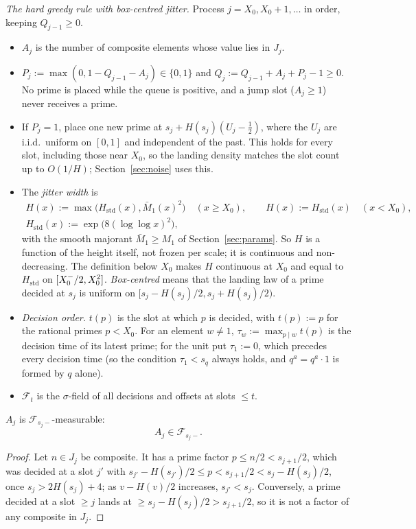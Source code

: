 \emph{The hard greedy rule with box-centred jitter.} Process $j=X_0,X_0+1,\dots$ in order, keeping $Q_{j-1}\ge0$.
\begin{itemize}
\item $A_j$ is the number of composite elements whose value lies in $J_j$.
\item $P_j:=\max(0,1-Q_{j-1}-A_j)\in\{0,1\}$ and $Q_j:=Q_{j-1}+A_j+P_j-1\ge0$. No prime is placed while the queue is positive, and a
jump slot ($A_j\ge1$) never receives a prime.
\item If $P_j=1$, place one new prime at $s_j+H(s_j)(U_j-\tfrac12)$, where the $U_j$ are i.i.d.\ uniform on $[0,1]$ and independent
of the past. This holds for every slot, including those near $X_0$, so the landing density matches the slot count up to
$O(1/H)$; Section~\ref{sec:noise} uses this.
\item The \emph{jitter width} is
\begin{equation}\label{eq:jitter}
\begin{gathered}
  H(x):=\max\bigl(H_{\mathrm{std}}(x),\bar M_1(x)^2\bigr)\quad(x\ge X_0),\qquad H(x):=H_{\mathrm{std}}(x)\quad(x<X_0),\\
  H_{\mathrm{std}}(x):=\exp\bigl(8(\log\log x)^2\bigr),
\end{gathered}
\end{equation}
with the smooth majorant $\bar M_1\ge M_1$ of Section~\ref{sec:params}. So $H$ is a function of the height itself, not frozen per
scale; it is continuous and non-decreasing. The definition below $X_0$ makes $H$ continuous at $X_0$ and equal to
$H_{\mathrm{std}}$ on $[X_0^{-}/2,X_0^2]$. \emph{Box-centred} means that the landing law of a prime decided at $s_j$ is uniform on
$[s_j-H(s_j)/2,s_j+H(s_j)/2)$.
\item \emph{Decision order.} $t(p)$ is the slot at which $p$ is decided, with $t(p):=p$ for the rational primes $p<X_0$. For an
element $w\ne1$, $\tau_w:=\max_{p\mid w}t(p)$ is the decision time of its latest prime; for the unit put $\tau_1:=0$, which
precedes every decision time (so the condition $\tau_1<s_q$ always holds, and $q^a=q^a\cdot1$ is formed by $q$ alone).
\item $\mathcal F_t$ is the $\sigma$-field of all decisions and offsets at slots $\le t$.
\end{itemize}

\begin{lemma}[Causality]\label{lem:C2}
$A_j$ is $\mathcal F_{s_j-}$-measurable:
\begin{equation}\label{eq:C2}
  A_j\in\mathcal F_{s_j-}.
\end{equation}
\end{lemma}
\begin{proof}
Let $n\in J_j$ be composite. It has a prime factor $p\le n/2<s_{j+1}/2$, which was decided at a slot $j'$ with
$s_{j'}-H(s_{j'})/2\le p<s_{j+1}/2<s_j-H(s_j)/2$, once $s_j>2H(s_j)+4$; as $v-H(v)/2$ increases, $s_{j'}<s_j$. Conversely, a prime
decided at a slot $\ge j$ lands at $\ge s_j-H(s_j)/2>s_{j+1}/2$, so it is not a factor of any composite in $J_j$.
\end{proof}


